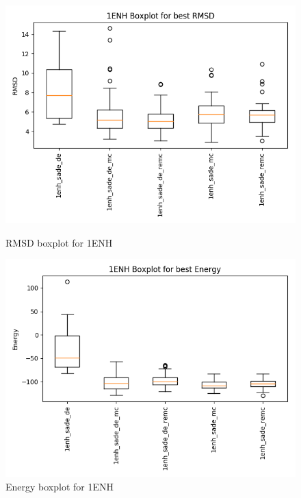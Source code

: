 \begin{figure}[ht]
    \begin{minipage}[b]{0.45\linewidth}
        \centering
        \includegraphics[width=\textwidth]{Figuras/boxplots/1enh_rmsd_boxplot.png}
        \caption{RMSD boxplot for 1ENH}
        \label{fig:1enh-rmsd-boxplot}
    \end{minipage}
    \hspace{0.5cm}
    \begin{minipage}[b]{0.45\linewidth}
        \centering
        \includegraphics[width=\textwidth]{Figuras/boxplots/1enh_energy_boxplot.png}
        \caption{Energy boxplot for 1ENH}
        \label{fig:1enh-energy-boxplot}
    \end{minipage}
\end{figure}

